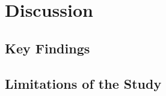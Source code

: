 \chapter{Discussion}
\label{cha:discussion}

\section{Key Findings}
\label{sec:keyfindings}



\section{Limitations of the Study}
\label{sec:limitationsofthestudy}

